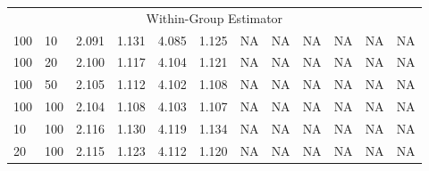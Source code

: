 \documentclass[a4paper]{article}
\begin{document}
\begin{table}[]
\begin{threeparttable}
\begin{tabular}{llllllllllll}
\multicolumn{12}{c}{Within-Group Estimator}                                                                                                                                                                                                                                                                                                                                  \\
100 & 10  & 2.091                                                        & 1.131 & 4.085                                                        & 1.125 & NA                                                       & NA    & NA                                                          & NA    & NA                                                          & NA    \\
100 & 20  & 2.100                                                        & 1.117 & 4.104                                                        & 1.121 & NA                                                       & NA    & NA                                                          & NA    & NA                                                          & NA    \\
100 & 50  & 2.105                                                        & 1.112 & 4.102                                                        & 1.108 & NA                                                       & NA    & NA                                                          & NA    & NA                                                          & NA    \\
100 & 100 & 2.104                                                        & 1.108 & 4.103                                                        & 1.107 & NA                                                       & NA    & NA                                                          & NA    & NA                                                          & NA    \\
10  & 100 & 2.116                                                        & 1.130 & 4.119                                                        & 1.134 & NA                                                       & NA    & NA                                                          & NA    & NA                                                          & NA    \\
20  & 100 & 2.115                                                        & 1.123 & 4.112                                                        & 1.120 & NA                                                       & NA    & NA                                                          & NA    & NA                                                          & NA    \\

\end{tabular}
\end{threeparttable}
\end{table}
\end{document}
